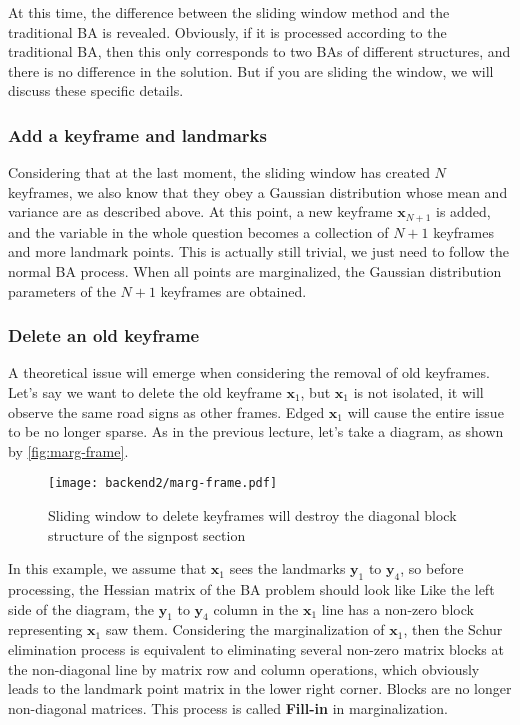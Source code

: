 At this time, the difference between the sliding window method and the traditional BA is revealed. Obviously, if it is processed according to the traditional BA, then this only corresponds to two BAs of different structures, and there is no difference in the solution. But if you are sliding the window, we will discuss these specific details.

\subsubsection{Add a keyframe and landmarks}
Considering that at the last moment, the sliding window has created $N$ keyframes, we also know that they obey a Gaussian distribution whose mean and variance are as described above. At this point, a new keyframe $\bm{x}_{N+1}$ is added, and the variable in the whole question becomes a collection of $N+1$ keyframes and more landmark points. This is actually still trivial, we just need to follow the normal BA process. When all points are marginalized, the Gaussian distribution parameters of the $N+1$ keyframes are obtained.

\subsubsection{Delete an old keyframe}
A theoretical issue will emerge when considering the removal of old keyframes. Let's say we want to delete the old keyframe $\bm{x}_1$, but $\bm{x}_1$ is not isolated, it will observe the same road signs as other frames. Edged $\bm{x}_1$ will cause the entire issue to be no longer sparse. As in the previous lecture, let's take a diagram, as shown by \autoref{fig:marg-frame}.

\begin{figure}[!ht]
    \centering
    \texttt{[image: backend2/marg-frame.pdf]}
    \caption{Sliding window to delete keyframes will destroy the diagonal block structure of the signpost section}
    \label{fig:marg-frame}
\end{figure}

In this example, we assume that $\bm{x}_1$ sees the landmarks $\bm{y}_1$ to $\bm{y}_4$, so before processing, the Hessian matrix of the BA problem should look like Like the left side of the diagram, the $\bm{y}_1$ to $\bm{y}_4$ column in the $\bm{x}_1$ line has a non-zero block representing $\bm{x}_1 $ saw them. Considering the marginalization of $\bm{x}_1$, then the Schur elimination process is equivalent to eliminating several non-zero matrix blocks at the non-diagonal line by matrix row and column operations, which obviously leads to the landmark point matrix in the lower right corner. Blocks are no longer non-diagonal matrices. This process is called \textbf{Fill-in}\textsuperscript{\cite{Sibley2008}} in marginalization.

